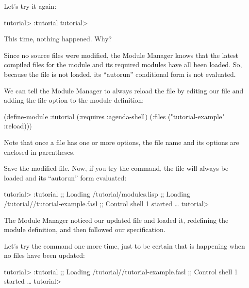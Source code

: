\documentclass[10pt,twoside,english,pdftex]{article}
\begin{document}
Let's try it again:
%
\W\supp
\begin{smallexample}
\textcolor{darkergray}{%
  tutorial> \textcolor{black}{:tutorial}
  tutorial>}
\end{smallexample}
%
This time, nothing happened.  Why?

Since no source files were modified, the Module Manager knows that the latest
compiled files for the  module and its required modules have
all been loaded.  So, because the  file is not
loaded, its ``autorun'' conditional form is not evaluated.

We can tell the Module Manager to always reload the
 file by editing our 
file and adding the  file option to the  module
definition:
%
\W\supp
\begin{example}
\textcolor{darkergray}{%
  (define-module :tutorial
    (:requires :agenda-shell)
    (:files \textcolor{black}{(}"tutorial-example" \textcolor{black}{:reload})))}
\end{example}
%
Note that once a file has one or more options, the file name and its options
are enclosed in parentheses.

Save the modified  file. Now, if you try the
 command, the  file will always
be loaded and its ``autorun'' form evaluated:
%
\W\supp
\begin{smallexample}
\textcolor{darkergray}{%
  tutorial> \textcolor{black}{:tutorial}
  ;; Loading /tutorial/modules.lisp
  ;; Loading /tutorial//tutorial-example.fasl
  ;; Control shell 1 started
     \textrm{\ldots{}}
  tutorial>}
\end{smallexample}
%
The Module Manager noticed our updated  file and
loaded it, redefining the  module definition, and then
followed our  specification.

Let's try the  command one more time, just to be certain that
 is happening when no files have been updated:
%
\W\supp
\begin{smallexample}
\textcolor{darkergray}{%
  tutorial> \textcolor{black}{:tutorial}
  ;; Loading /tutorial//tutorial-example.fasl
  ;; Control shell 1 started
     \textrm{\ldots{}}
  tutorial>}
\end{smallexample}
\end{document}
